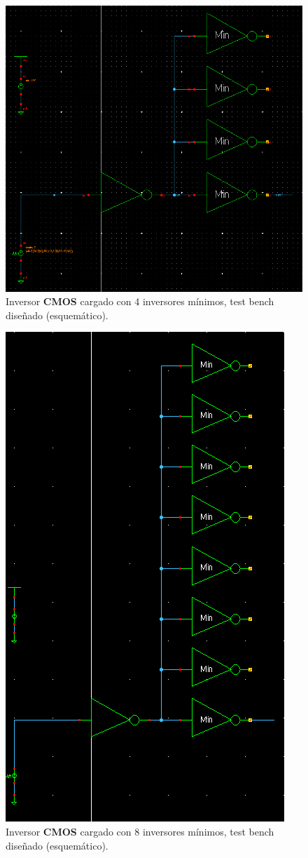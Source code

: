 \begin{figure}[H] %
\begin{center}
\includegraphics[width=0.8 \textwidth, angle=0]{./img/point2/TEST_LOGIC_GATES_tb_inverter_4_response_schematic}
\caption{\label{fig:fig_inverter_4_min_load_schematic}\footnotesize{Inversor \textbf{CMOS} cargado con 4 inversores mínimos, test bench diseñado (esquemático).}}
\end{center}
\end{figure}

\vfill
\clearpage

\begin{figure}[H] %
\begin{center}
\includegraphics[width=0.4 \textwidth, angle=0]{./img/point2/TEST_LOGIC_GATES_tb_inverter_8_response_schematic}
\caption{\label{fig:fig_inverter_8_min_load_schematic}\footnotesize{Inversor \textbf{CMOS} cargado con 8 inversores mínimos, test bench diseñado (esquemático).}}
\end{center}
\end{figure}

